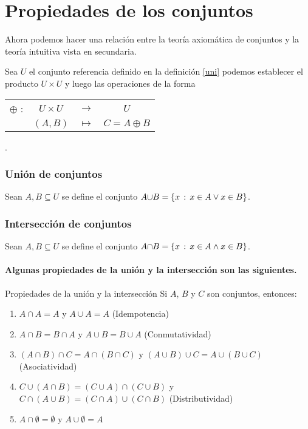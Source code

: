 \section{Propiedades de los conjuntos}

Ahora podemos hacer una relación entre la teoría axiomática de conjuntos
y la teoría intuitiva vista en secundaria.

Sea $U$ el conjunto referencia definido en la definición \ref{uni}
podemos establecer el producto $U\times U$ y luego las operaciones
de la forma %
\begin{tabular}{cccc}
$\oplus$ : &
$U\times U$ &
$\rightarrow$ &
$U$\tabularnewline
 &
$\left(A,B\right)$ &
$\mapsto$ &
$C=A\oplus B$\tabularnewline
\end{tabular}.

\subsubsection{Unión de conjuntos}

Sean $A,B\subseteq U$ se define el conjunto $A\text{\ensuremath{\cup}\ensuremath{B=\ensuremath{\left\{ x\,:\,x\in A\vee x\in B\right\} }}}$.

\subsubsection{Intersección de conjuntos}

Sean $A,B\subseteq U$ se define el conjunto $A\text{\ensuremath{\cap}\ensuremath{B=\ensuremath{\left\{ x\,:\,x\in A\wedge x\in B\right\} }}}$.

\paragraph{Algunas propiedades de la unión y la intersección son las siguientes.}

\begin{teo}{Propiedades de la unión y la intersección}{} Si $A$, $B$ y $C$ son conjuntos, entonces: \begin{enumerate} 
\item $A\cap A=A$ y $A\cup A=A$ \hfill {\sc (Idempotencia)} 
\item $A\cap B=B\cap A$ y $A\cup B=B\cup A$ \hfill {\sc (Conmutatividad)} 
\item $(A\cap B)\cap C=A\cap(B\cap C)$ y $(A\cup B)\cup C=A\cup(B\cup C)$ \hfill {\sc (Asociatividad)}
\item $C\cup (A\cap B)=(C\cup A)\cap (C\cup B)$ y $C\cap (A\cup B)=(C\cap A)\cup (C\cap B)$ \hfill {\sc (Distributividad)}
\item  $A\cap \emptyset= \emptyset$ y $A\cup \emptyset =A$ 
\end{enumerate}
\end{teo}

